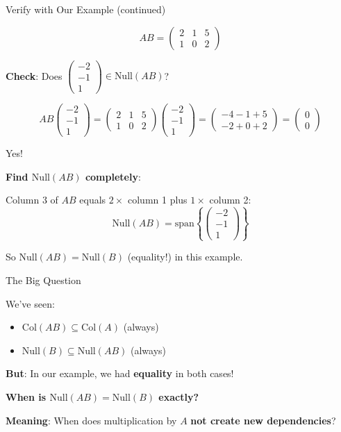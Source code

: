 \documentclass[10pt]{beamer}
\theoremstyle{definition}
\newcommand{\x}[1]{\alert{\textbf{#1}}}
\begin{document}
\begin{frame}{Verify with Our Example (continued)}

$$AB = \begin{pmatrix} 2 & 1 & 5 \\ 1 & 0 & 2 \end{pmatrix}$$

\x{Check}: Does $\begin{pmatrix} -2\\-1\\1 \end{pmatrix} \in \text{Null}(AB)$?

$$AB\begin{pmatrix} -2\\-1\\1 \end{pmatrix} = \begin{pmatrix} 2 & 1 & 5 \\ 1 & 0 & 2 \end{pmatrix}\begin{pmatrix} -2\\-1\\1 \end{pmatrix} = \begin{pmatrix} -4-1+5\\-2+0+2 \end{pmatrix} = \begin{pmatrix} 0\\0 \end{pmatrix}$$

Yes! \checkmark

\x{Find $\text{Null}(AB)$ completely}:

Column 3 of $AB$ equals $2 \times$ column 1 plus $1 \times$ column 2:
$$\text{Null}(AB) = \text{span}\left\{\begin{pmatrix} -2\\-1\\1 \end{pmatrix}\right\}$$

So $\text{Null}(AB) = \text{Null}(B)$ (equality!) in this example.

\end{frame}

\begin{frame}{The Big Question}

We've seen:

\begin{itemize}
\item $\text{Col}(AB) \subseteq \text{Col}(A)$ (always)
\item $\text{Null}(B) \subseteq \text{Null}(AB)$ (always)
\end{itemize}

\x{But}: In our example, we had \x{equality} in both cases!

\begin{center}
\Large
\textbf{When is $\text{Null}(AB) = \text{Null}(B)$ exactly?}
\end{center}

\x{Meaning}: When does multiplication by $A$ \x{not create new dependencies}?

\end{frame}
\end{document}
